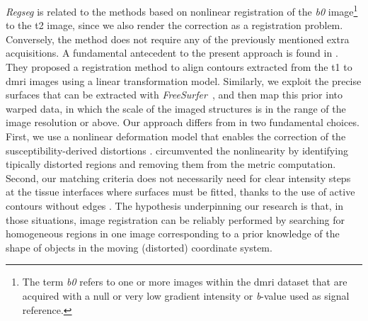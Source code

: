 \emph{Regseg} is related to the methods based on nonlinear registration of the \emph{b0}
  image\footnote{The term \emph{b0} refers to one or more images within the
  \gls*{dmri} dataset that are acquired with a null or very low gradient intensity or
   \emph{b}-value used as signal reference.}
  to the \gls*{t2} image, since we also render the correction as a
  registration problem.
Conversely, the method does not require any of the previously mentioned extra acquisitions.
A fundamental antecedent to the present approach is found in \citep{greve_accurate_2009}.
They proposed a registration method to align contours extracted from the \gls*{t1}
  to \gls*{dmri} images using a linear transformation model.
Similarly, we exploit the precise surfaces that can be extracted with
  \emph{FreeSurfer}~\citep{fischl_freesurfer_2012},
  and then map this prior into warped data, in which the scale of the
  imaged structures is in the range of the image resolution or above.
Our approach differs from \citep{greve_accurate_2009} in two fundamental choices.
First, we use a nonlinear deformation model that enables the correction of the
  susceptibility-derived distortions \citep{jezzard_correction_1995}.
\cite{greve_accurate_2009} circumvented the nonlinearity by identifying tipically
  distorted regions and removing them from the metric computation.
Second, our matching criteria does not necessarily need for clear intensity
  steps at the tissue interfaces where surfaces must be fitted, thanks to the use of
  active contours without edges \citep{chan_active_2001}.
The hypothesis underpinning our research is that, in those situations,
  image registration can be reliably performed by searching for homogeneous
  regions in one image corresponding to a prior knowledge of the shape of objects in
  the moving (distorted) coordinate system.
